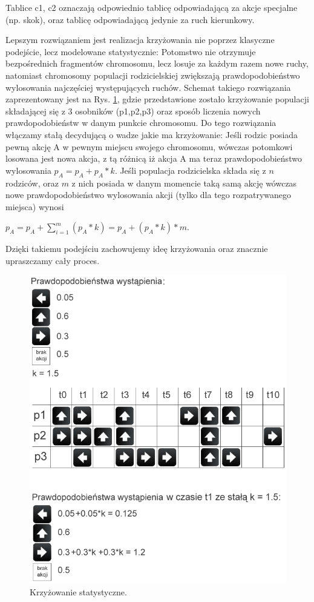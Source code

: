 \begin{par}
\begin{enumerate}
\begin{par}
		Tablice c1, c2 oznaczają odpowiednio tablicę odpowiadającą za akcje specjalne (np. skok), oraz tablicę odpowiadającą jedynie za ruch kierunkowy.

		Lepszym rozwiązaniem jest realizacja krzyżowania nie poprzez klasyczne podejście, lecz modelowane statystycznie: Potomstwo nie otrzymuje bezpośrednich fragmentów chromosomu, lecz losuje za każdym razem nowe ruchy,
		natomiast chromosomy populacji rodzicielskiej zwiększają prawdopodobieństwo wylosowania najczęściej występujących ruchów.
		Schemat takiego rozwiązania zaprezentowany jest na Rys. \ref{fig:krzyżowanie}, gdzie przedstawione zostało krzyżowanie populacji składającej się z 3 osobników (p1,p2,p3) oraz sposób liczenia nowych prawdopodobieństw w danym punkcie chromosomu.
		Do tego rozwiązania włączamy stałą decydującą o wadze jakie ma krzyżowanie: Jeśli rodzic posiada pewną akcję A w pewnym miejscu swojego chromosomu,
		wówczas potomkowi losowana jest nowa akcja, z tą różnicą iż akcja A ma teraz prawdopodobieństwo wylosowania $p_A = p_A + p_A*k$. Jeśli populacja rodzicielska składa się z $n$ rodziców,
		oraz $m$ z nich posiada w danym momencie taką samą akcję wówczas nowe prawdopodobieństwo wylosowania akcji (tylko dla tego rozpatrywanego miejsca) wynosi 
		\begin{center}
		$p_A =  p_A + {\displaystyle\sum\limits_{i=1}^m (p_A*k)} = p_A + (p_A*k)*m$.
		\end{center}
		Dzięki takiemu podejściu zachowujemy ideę krzyżowania oraz znacznie upraszczamy cały proces.
		
		\begin{figure}[!h]
		\centering
		\includegraphics[width=5in]{obrazki/stat_cross.png}
		\caption{Krzyżowanie statystyczne.}
		\label{fig:krzyżowanie}
		\end{figure}


\end{par}
\end{enumerate}
\end{par}
